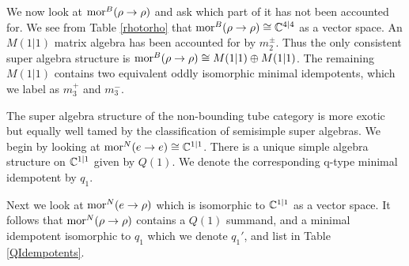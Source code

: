 We now look at $\text{mor}^B(\rho \to \rho)$ and ask which part of it has not been accounted for. 
We see from Table \ref{rhotorho} that $\text{mor}^B(\rho \to \rho) \cong \mathbb{C}^{4|4}$ as a vector space. 
An $M(1|1)$ matrix algebra has been accounted for by $m_2^{\pm}$. 
Thus the only consistent super algebra structure is $\text{mor}^B(\rho \to \rho) \cong M(1|1) \oplus M(1|1)$.
The remaining $M(1|1)$ contains two equivalent oddly isomorphic minimal idempotents, 
which we label as $m_3^+$ and $m_3^-$.


\medskip

The super algebra structure of the non-bounding tube category is more exotic but equally well tamed by the classification of semisimple super algebras.
We begin by looking at $\text{mor}^N(e\to e) \cong \mathbb{C}^{1|1}$. 
There is a unique simple algebra structure on $\mathbb{C}^{1|1}$ given by $Q(1)$. 
We denote the corresponding q-type minimal idempotent by $q_1$.

Next we look at $\text{mor}^N(e \to \rho)$ which is isomorphic to $\mathbb{C}^{1|1}$ as a vector space. 
It follows that $\text{mor}^N(\rho \to \rho)$ contains a $Q(1)$ summand, 
and a minimal idempotent isomorphic to $q_1$ which we denote $q_1'$, and list in Table \ref{QIdempotents}. 

